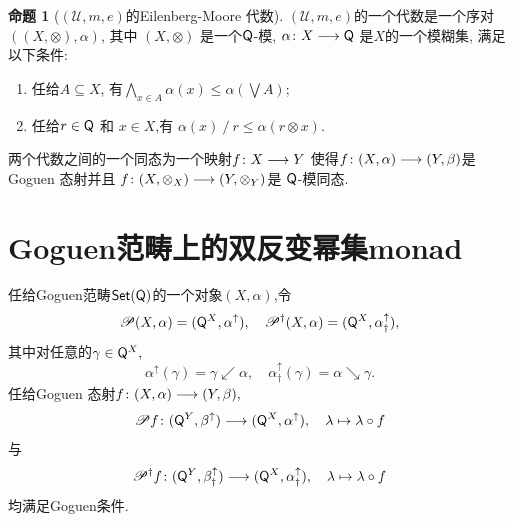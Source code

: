 \documentclass[UTF8]{beamer}
\theoremstyle{definition}
\newtheorem{prop}[thm]{命题}
\theoremstyle{definition}
\DeclareMathOperator{\ldd}{/}
\newcommand{\sQ}{{\sf Q}}
\newcommand{\bv}{\bigvee}
\newcommand{\bw}{\bigwedge}
\numberwithin{equation}{section}
\begin{document}

\begin{frame}{}
\begin{prop}[$(\mathscr{U}, m, e)$的Eilenberg-Moore 代数] $(\mathscr{U}, m, e)$的一个代数是一个序对 $((X,\otimes),\alpha)$, 其中 $(X,\otimes)$ 是一个$\sQ$-模, $\alpha\colon X\lra\sQ$ 是$X$的一个模糊集,  满足以下条件: \begin{enumerate}[label={\rm(\roman*)}] \setlength{\itemsep}{0pt}
\item 任给$A\subseteq X$, 有$\bw_{x\in A}\alpha(x)\leq\alpha(\bv A)$;
\item 任给$r\in\sQ$ 和 $x\in X$,有 $\alpha(x)\ldd r\leqslant \alpha(r\otimes x)$.\end{enumerate}

两个代数之间的一个同态为一个映射$f\colon X\longrightarrow Y$ 使得$f\colon(X,\alpha)\longrightarrow(Y,\beta)$是Goguen 态射并且 $f\colon(X,\otimes_X)\longrightarrow(Y,\otimes_Y)$是 $\sQ$-模同态.\end{prop}
\end{frame}

\section{Goguen范畴上的双反变幂集monad}
\begin{frame}
任给Goguen范畴$\sf Set(\sQ)$的一个对象$(X,\alpha)$,令$$\mathscr{P}(X,\alpha)=(\sQ^{X},\alpha^\uparrow),\quad\mathscr{P}^\dagger(X,\alpha)=(\sQ^X,\alpha_\dagger^\uparrow),$$其中对任意的$\gamma\in\sQ^X,$ $$\alpha^\uparrow(\gamma)=\gamma\swarrow\alpha,\quad\alpha_\dagger^\uparrow(\gamma)=\alpha\searrow\gamma.$$
任给Goguen 态射$f\colon (X,\alpha)\longrightarrow(Y,\beta),$ $$\mathscr{P}f\colon (\sQ^Y,\beta^\uparrow)\lra(\sQ^X,\alpha^\uparrow),\quad\lambda\mapsto\lambda\circ f$$与$$\mathscr{P}^\dagger f\colon (\sQ^Y,\beta^\uparrow_\dagger)\lra(\sQ^X,\alpha^\uparrow_\dagger),\quad\lambda\mapsto\lambda\circ f$$均满足Goguen条件.
\end{frame}
\end{document}
